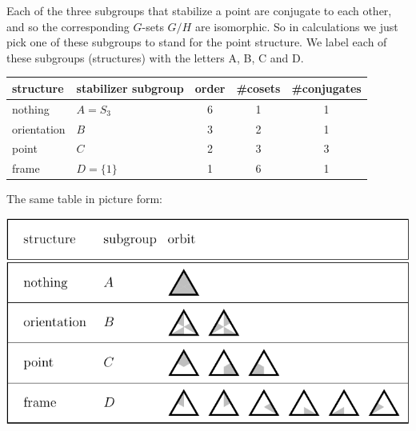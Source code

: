 \documentclass[11pt,oneside]{article}
\begin{document}

%
%
%
%

Each of the three subgroups that stabilize a point are conjugate
to each other, and so the corresponding $G$-sets $G/H$ are isomorphic.
So in calculations we just pick one of these subgroups
to stand for the point structure.
We label each of these subgroups (structures) with 
the letters A, B, C and D.

\begin{samepage}
\begin{center}
\begin{tabular}{ |l|l|c|c|c| }
\hline
structure & stabilizer subgroup & order & \#cosets & \#conjugates \\
\hline
\hline
nothing & $A=S_3$ &       6        &  1      &   1         \\
\hline
orientation &$B$ &       3        &  2      &   1         \\
\hline
point & $C$ &       2        &  3      &   3         \\
\hline
frame & $D=\{1\}$ &       1        &  6      &   1         \\
\hline
\end{tabular}
\end{center}
\end{samepage}

The same table in picture form:
\begin{center}
\includegraphics[]{pic-triangle-structures.pdf} 
\end{center}
\end{document}
